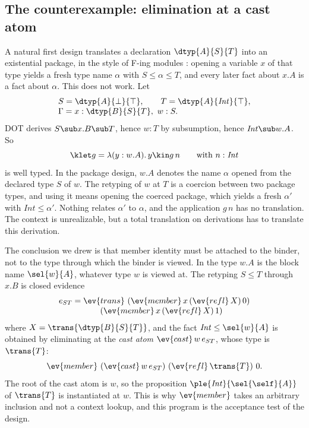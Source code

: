 \subsection{The counterexample: elimination at a cast atom}\label{sec:counterexample}

A natural first design translates a declaration $\dtyp{A}{S}{T}$ into an existential package, in the style of F-ing modules \cite{rossberg2014fing}: opening a variable $x$ of that type yields a fresh type name $\alpha$ with $S \le \alpha \le T$, and every later fact about $x.A$ is a fact about $\alpha$. This does not work. Let
\[
\begin{array}{@{}l@{}}
S = \dtyp{A}{\bot}{\top}, \qquad T = \dtyp{A}{\mathit{Int}}{\top}, \\
\Gamma = x : \dtyp{B}{S}{T},\ w : S .
\end{array}
\]
DOT derives $S \sub x.B \sub T$, hence $w : T$ by subsumption, hence $\mathit{Int} \sub w.A$. So
\[
\klet g = \lambda(y : w.A).\,y \kin g\,n \qquad \text{with } n : \mathit{Int}
\]
is well typed. In the package design, $w.A$ denotes the name $\alpha$ opened from the declared type $S$ of $w$. The retyping of $w$ at $T$ is a coercion between two package types, and using it means opening the coerced package, which yields a fresh $\alpha'$ with $\mathit{Int} \le \alpha'$. Nothing relates $\alpha'$ to $\alpha$, and the application $g\,n$ has no translation. The context is unrealizable, but a total translation on derivations has to translate this derivation.

The conclusion we drew is that member identity must be attached to the binder, not to the type through which the binder is viewed. In \FCdot the type $w.A$ is the block name $\sel{w}{A}$, whatever type $w$ is viewed at. The retyping $S \le T$ through $x.B$ is closed evidence
\[
\begin{array}{@{}l@{}}
e_{ST} = \ev{trans}\ (\ev{member}\,x\,(\ev{refl}\,X)\,0) \\
\qquad\qquad\quad (\ev{member}\,x\,(\ev{refl}\,X)\,1)
\end{array}
\]
where $X = \trans{\dtyp{B}{S}{T}}$, and the fact $\mathit{Int} \le \sel{w}{A}$ is obtained by eliminating at the \emph{cast atom} $\ev{cast}\,w\,e_{ST}$, whose type is $\trans{T}$:
\[
\ev{member}\ (\ev{cast}\,w\,e_{ST})\ (\ev{refl}\,\trans{T})\ 0 .
\]
The root of the cast atom is $w$, so the proposition $\ple{\mathit{Int}}{\sel{\self}{A}}$ of $\trans{T}$ is instantiated at $w$. This is why $\ev{member}$ takes an arbitrary inclusion and not a context lookup, and this program is the acceptance test of the design.


